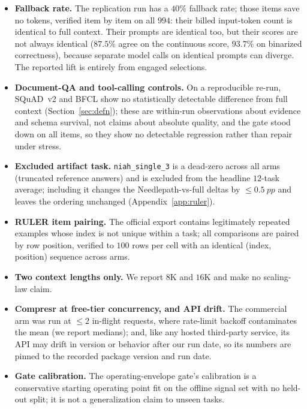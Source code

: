 \documentclass[11pt]{article}
\newcommand{\pp}{~pp}          %
\newcommand{\NP}{Needlepath}
\begin{document}
\begin{itemize}
  ($52.2$/$77.1$\,ms); a hosted production deployment adds wide-area transit and is measured in the
  \texttt{remote\_api\_*} classes.
  \item \textbf{Fallback rate.} The replication run has a $40\%$ fallback rate; those items save no
  tokens, verified item by item on all $994$: their billed input-token count is identical to full
  context. Their prompts are identical too, but their scores are not always identical ($87.5\%$
  agree on the continuous score, $93.7\%$ on binarized correctness), because separate model calls
  on identical prompts can diverge. The reported lift is entirely from engaged selections.
  \item \textbf{Document-QA and tool-calling controls.} On a reproducible re-run, SQuAD~v2 and BFCL
  show no statistically detectable difference from full context (Section~\ref{sec:defn}); these are
  within-run observations about evidence and schema survival, not claims about absolute quality, and
  the gate stood down on all items, so they show no detectable regression rather than repair under
  stress.
  \item \textbf{Excluded artifact task.} \texttt{niah\_single\_3} is a dead-zero across all arms
  (truncated reference answers) and is excluded from the headline $12$-task average; including it
  changes the \NP{}-vs-full deltas by $\le 0.5\pp$ and leaves the ordering unchanged
  (Appendix~\ref{app:ruler}).
  \item \textbf{RULER item pairing.} The official export contains legitimately repeated examples
  whose index is not unique within a task; all comparisons are paired by row position, verified to
  $100$ rows per cell with an identical (index, position) sequence across arms.
  \item \textbf{Two context lengths only.} We report $8$K and $16$K and make no scaling-law claim.
  \item \textbf{Compresr at free-tier concurrency, and API drift.} The commercial arm was run at
  $\le 2$ in-flight requests, where rate-limit backoff contaminates the mean (we report medians);
  and, like any hosted third-party service, its API may drift in version or behavior after our run
  date, so its numbers are pinned to the recorded package version and run date.
  \item \textbf{Gate calibration.} The operating-envelope gate's calibration is a conservative
  starting operating point fit on the offline signal set with no held-out split; it is not a
  generalization claim to unseen tasks.
\end{itemize}
\end{document}

